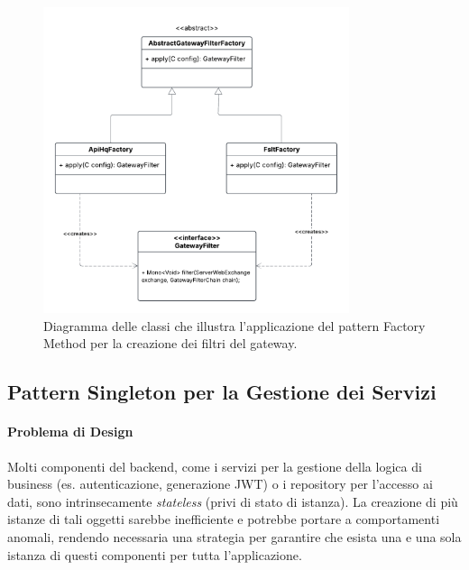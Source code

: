 \documentclass[12pt,a4paper,openright,twoside]{book}
\begin{document}
\vspace{1cm}
\begin{figure}[h!]
    \centering
    \includegraphics[width=0.8\textwidth]{figures/gwfactory.pdf}
    \caption{Diagramma delle classi che illustra l'applicazione del pattern Factory Method per la creazione dei filtri del gateway.}
    \label{fig:factory_method_uml}
\end{figure}
\vspace{1cm}

\subsection{Pattern Singleton per la Gestione dei Servizi}
\label{subsec:design_singleton}

\paragraph{Problema di Design}
Molti componenti del backend, come i servizi per la gestione della logica di business (es. autenticazione, generazione JWT) o i repository per l'accesso ai dati, sono intrinsecamente \textit{stateless} (privi di stato di istanza). La creazione di più istanze di tali oggetti sarebbe inefficiente e potrebbe portare a comportamenti anomali, rendendo necessaria una strategia per garantire che esista una e una sola istanza di questi componenti per tutta l'applicazione.
\end{document}

